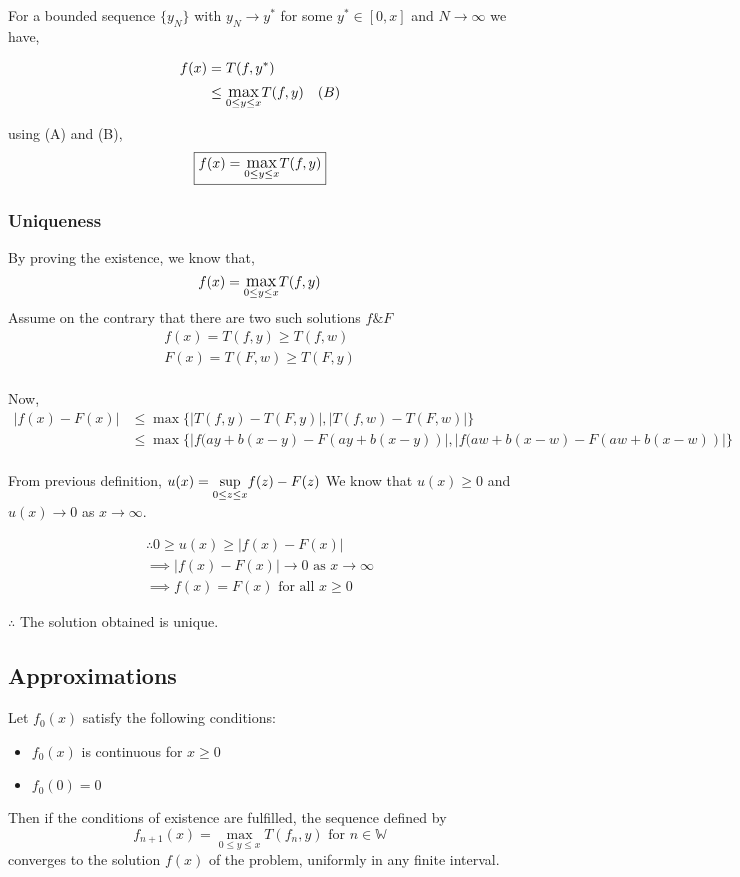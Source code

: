 For a bounded sequence $\{y_N\}$ with $y_N \rightarrow y^*$ for some $y^* \in [0, x]$ and $N \rightarrow \infty$ we have,

\begin{align*}
    f(x) &= T(f, y^*) \\
        &\le \mathlarger{\max}_{0 \le y \le x} T(f, y) & (B)\\
\end{align*}

using (A) and (B), 
$$
\boxed{f(x) = \mathlarger{\max}_{0 \le y \le x} T(f, y)}
$$

\subsubsection{Uniqueness}
By proving the existence, we know that,
$$f(x) = \mathlarger{\max}_{0 \le y \le x} T(f, y)$$
Assume on the contrary that there are two such solutions $f \& F$
\begin{align*}
    f(x) = T(f, y) \ge T(f, w)\\
    F(x) = T(F, w) \ge T(F, y)\\
\end{align*}

Now,
\begin{align*}
    |f(x) - F(x)| &\le \max\{|T(f, y) - T(F, y)|,|T(f, w) - T(F, w)|\}\\
                    &\le \max\{|f(ay+b(x-y) - F(ay+b(x-y))|,|f(aw+b(x-w) - F(aw+b(x-w))|\}\\
\end{align*}

From previous definition, $u(x) = \mathlarger{\sup}_{0 \le z \le x} f(z) - F(z)$
We know that $u(x) \ge 0$ and $u(x) \rightarrow 0$ as $x \rightarrow \infty$.

\begin{align*}
    \therefore 0 \ge u(x) \ge |f(x) - F(x)| \\
    \implies |f(x) - F(x)| \rightarrow 0 \text{ as } x \rightarrow \infty\\
    \implies f(x) = F(x) \text{ for all } x \ge 0
\end{align*}

$\therefore$ The solution obtained is unique.

\subsection{Approximations}

\begin{theorem}
    Let $f_0(x)$ satisfy the following conditions:
    \begin{itemize}
        \item $f_0(x)$ is continuous for $x \ge 0$
        \item $f_0(0) = 0$
    \end{itemize}

    Then if the conditions of existence are fulfilled, the sequence defined by
    $$
        f_{n+1}(x) = \max_{0 \le y \le x} T(f_n, y) \text{ for } n \in \mathbb{W}
    $$
    converges to the solution $f(x)$ of the problem, uniformly in any finite interval.
\end{theorem}

